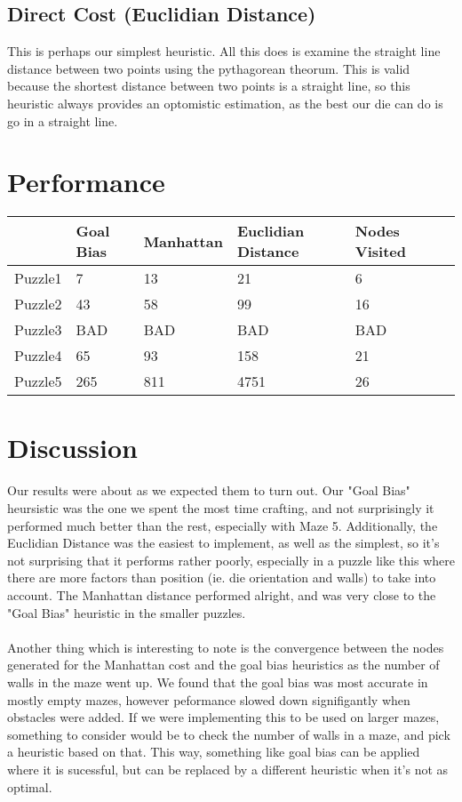 \documentclass{article}
\begin{document}
\subsection*{Direct Cost (Euclidian Distance)}
This is perhaps our simplest heuristic.  All this does is examine the straight line distance between two points using the pythagorean theorum.  This is valid because the shortest distance between two points is a straight line, so this heuristic always provides an optomistic estimation, as the best our die can do is go in a straight line.

\section*{Performance}
\begin{center}
    \begin{tabular}{ | l | l | l |l|l|l}
    \hline
      &   Goal Bias &  Manhattan  & Euclidian Distance & Nodes Visited  \\ \hline
    Puzzle1 & 7 & 13&21&6  \\ \hline
    Puzzle2 & 43 & 58&99&16  \\ \hline
    Puzzle3 & BAD & BAD&BAD&BAD \\ \hline
    Puzzle4 & 65 & 93&158&21 \\ \hline
    Puzzle5 & 265 & 811&4751&26 \\ \hline

    \end{tabular}
\end{center}

\section*{Discussion}
Our results were about as we expected them to turn out.  Our "Goal Bias" heursistic was the one we spent the most time crafting, and not surprisingly it performed much better than the rest, especially with Maze 5.  Additionally, the Euclidian Distance was the easiest to implement, as well as the simplest, so it's not surprising that it performs rather poorly, especially in a puzzle like this where there are more factors than position (ie. die orientation and walls) to take into account.  The Manhattan distance performed alright, and was very close to the "Goal Bias" heuristic in the smaller puzzles.  \\\\
Another thing which is interesting to note is the convergence between the nodes generated for the Manhattan cost and the goal bias heuristics as the number of walls in the maze went up.  We found that the goal bias was most accurate in mostly empty mazes, however peformance slowed down signifigantly when obstacles were added.  If we were implementing this to be used on larger mazes, something to consider would be to check the number of walls in a maze, and pick a heuristic based on that.  This way, something like goal bias can be applied where it is sucessful, but can be replaced by a different heuristic when it's not as optimal.  
\end{document}
